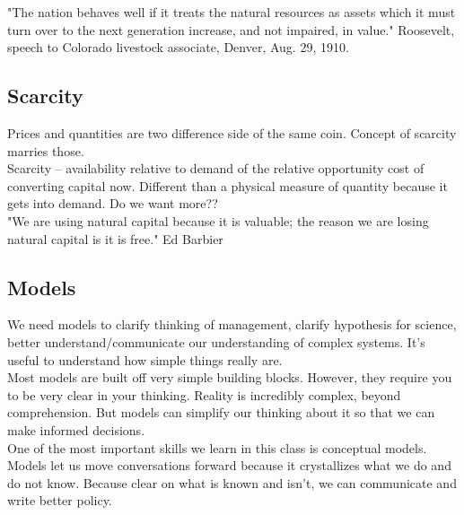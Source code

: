 \documentclass{article}
\begin{document}
"The nation behaves well if it treats the natural resources as assets which it must turn over to the next generation increase, and not impaired, in value." Roosevelt, speech to Colorado livestock associate, Denver, Aug. 29, 1910. \\

\subsection{Scarcity}
Prices and quantities are two difference side of the same coin. Concept of scarcity marries those. \\

Scarcity -- availability relative to demand of the relative opportunity cost of converting capital now. Different than a physical measure of quantity because it gets into demand. Do we want more?? \\

"We are using natural capital because it is valuable; the reason we are losing natural capital is it is free." Ed Barbier \\

\subsection{Models}
We need models to clarify thinking of management, clarify hypothesis for science, better understand/communicate our understanding of complex systems. It's useful to understand how simple things really are. \\

Most models are built off very simple building blocks. However, they require you to be very clear in your thinking. Reality is incredibly complex, beyond comprehension. But models can simplify our thinking about it so that we can make informed decisions. \\

One of the most important skills we learn in this class is conceptual models. Models let us move conversations forward because it crystallizes what we do and do not know. Because clear on what is known and isn't, we can communicate and write better policy. 
\end{document}
